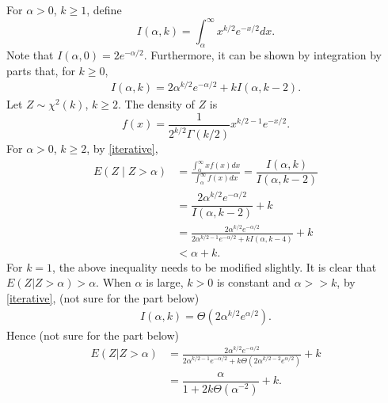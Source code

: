 \documentclass[]{article}
\title{}
\author{}
\newcommand\ddfrac[2]{\frac{\displaystyle #1}{\displaystyle #2}}
\begin{document}
\maketitle

\begin{abstract}

\end{abstract}

\section{}


For $\alpha>0$, $k\geq 1$, define 
\[I(\alpha,k) = \int_{\alpha}^\infty x^{k/2} e^{-x/2} dx. \]
Note that $I(\alpha,0)=2e^{-\alpha/2}$. Furthermore, it can be shown by integration by parts that, for $k\geq 0$,
\begin{align}\label{iterative}
I(\alpha,k) =  2\alpha^{k/2} e^{-\alpha/2}+kI(\alpha,k-2).
\end{align}
Let $Z\sim \chi^2(k)$, $k\geq 2$. The density of $Z$ is
\[ f(x) = \frac{1}{2^{k/2}\Gamma(k/2)} x^{k/2-1}e^{-x/2}.  \]
For $\alpha>0$, $k\geq 2$, by \eqref{iterative},
\begin{align*}
E(Z\mid Z>\alpha)&= \ddfrac{\int_{\alpha}^\infty xf(x) dx}{\int_{\alpha}^\infty f(x) dx} = \dfrac{I(\alpha,k)}{I(\alpha,k-2)} \\[1ex]
& =  \dfrac{2\alpha^{k/2} e^{-\alpha/2}}{I(\alpha,k-2)}+k\\
&= \ddfrac{2\alpha^{k/2} e^{-\alpha/2}}{2\alpha^{k/2-1} e^{-\alpha/2}+kI(\alpha, k-4)}+k \\[1ex]
&< \alpha+k.
\end{align*}
For $k=1$, the above inequality needs to be modified slightly.
It is clear that $E(Z|Z>\alpha)>\alpha$. 
When $\alpha$ is large, $k>0$ is constant and $\alpha>>k$, by \eqref{iterative}, (not sure for the part below)
\begin{align}\label{big_Theta}
I(\alpha,k) = \Theta(2\alpha^{k/2}e^{\alpha/2}).
\end{align}
Hence (not sure for the part below)
\begin{align*}
E(Z|Z>\alpha)&=\ddfrac{2\alpha^{k/2} e^{-\alpha/2}}{2\alpha^{k/2-1} e^{-\alpha/2}+k\Theta(2\alpha^{k/2-2}e^{\alpha/2})}+k \\[1ex]
&=\dfrac{\alpha}{1+2k\Theta(\alpha^{-2})}+k.
\end{align*}
\end{document}

